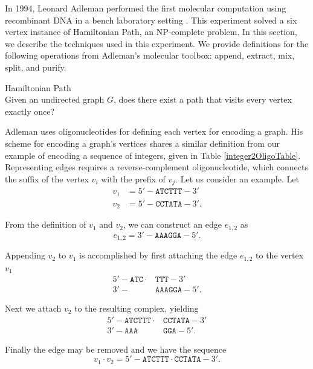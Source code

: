In 1994, Leonard Adleman performed the first molecular computation using recombinant DNA in a bench laboratory setting \cite{Adleman:1994:MCS:189441.189442}.  This experiment solved a six vertex instance of {\sc Hamiltonian Path}, an \textsf{NP-complete} problem.  In this section, we describe the techniques used in this experiment. We provide definitions for the following operations from Adleman's molecular toolbox: append, extract, mix, split, and purify.

\begin{definition}
{\sc Hamiltonian Path} \\
Given an undirected graph $G$, does there exist a path that visits every vertex exactly once?
\end{definition}

Adleman uses oligonucleotides for defining each vertex for encoding a graph.  His scheme for encoding a graph's vertices shares a similar definition from our example of encoding a sequence of integers, given in Table \ref{integer2OligoTable}.  Representing edges requires a reverse-complement oligonucleotide, which connects the suffix of the vertex $v_i$ with the prefix of $v_j$.  Let us consider an example.  Let
\begin{align*}
 v_1 &= 5'-\texttt{ATCTTT}-3' \\
 v_2 &= 5'-\texttt{CCTATA}-3'.
\end{align*}

\noindent From the definition of $v_1$ and $v_2$, we can construct an edge $e_{1,2}$ as
\[
e_{1,2} = 3'-\texttt{AAAGGA}-5'.
\]

\noindent Appending $v_2$ to $v_1$ is accomplished by first attaching the edge $e_{1,2}$ to the vertex $v_1$
\begin{align*}
 5'-\texttt{ATC}\cdot & \texttt{TTT}-3' \\
  3'-&\texttt{AAAGGA}-5'.
\end{align*}

\noindent Next we attach $v_2$ to the resulting complex, yielding
\begin{align*}
 5'-\texttt{ATCTTT} \cdot &\texttt{CCTATA}-3'\\
  3'-\texttt{AAA}&\texttt{GGA}-5'.
\end{align*}

\noindent Finally the edge may be removed and we have the sequence
\[
v_1 \cdot v_2 = 5'-\texttt{ATCTTT}\cdot \texttt{CCTATA}-3'.
\]

